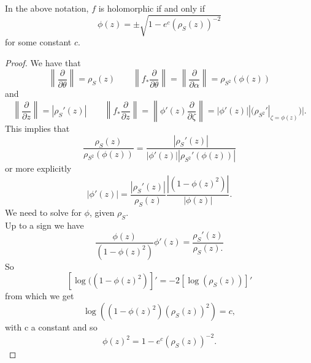 \documentclass[10pt,a4paper]{amsart}
\newcommand{\de}{\partial}
\begin{document}
\begin{Corollary}
In the above notation, $f$ is holomorphic if and only if 
\[
\phi(z) = \pm\sqrt{1 -  e^c  ( \rho_S (z))^{- 2}}
\]
for some constant $c$.
\end{Corollary}

\begin{proof}
We have that
\[
\left\| \frac{\de}{\de \theta} \right\| = \rho_{S}(z)       \qquad
\left\| f_*\frac{\de}{\de \theta} \right\|= \left\| \frac{\de}{\de \alpha} \right\|= \rho_{S^2}(\phi(z))
\]
and
\[
\left\| \frac{\de}{\de z} \right\|=|\rho_{S}'(z)| \qquad 
\left\| f_*\frac{\de}{\de z} \right\|= \left\| \phi'(z) \frac{\de}{\de \zeta} \right\|= |\phi'(z)| |(\rho_{S^2}'|_{\zeta=\phi(z)})|.
\]
This implies that
\[
\frac{\rho_{S}(z)}{\rho_{S^2}(\phi(z))}= \frac{|\rho_{S}'(z)|}{|\phi'(z)| |\rho_{S^2}'(\phi(z))|}
\]
or more explicitly
\[
|\phi'(z)|=    \frac{|\rho_{S}'(z)|    }{ \rho_{S}(z)}
                \frac{|(1-\phi(z)^2)|}{|\phi(z)|}.
\]
We need to solve for $\phi$, given $\rho_S$. \\
Up to a sign we have
$$
    \frac{\phi(z)} { (1-\phi(z)^2)}  \phi'(z) =   \frac{\rho_{S}'(z)    }{ \rho_{S}(z).}
              $$
              So
              $$
             [ \log ((1-\phi(z)^2) ]' =  - 2  [\log  (\rho_{S}  (z))]' 
              $$
              from which we get
              \[
              \log  \left ( (1-\phi(z)^2) (\rho_S (z))^2 \right) =c, 
              \]
              with c a constant and so 
              \[
              \phi(z)^2 = 1 -  e^c  ( \rho_S (z))^{- 2}.
              \]
\end{proof}             
\end{document}
